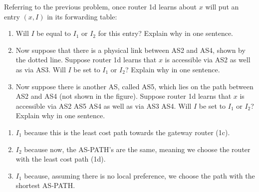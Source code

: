 \documentclass{report}
\begin{document}
\newpage
\begin{problem}
Referring to the previous problem, once router 1d learns about $x$ will put an entry $(x, I)$ in its forwarding table:
\begin{enumerate}
\item Will $I$ be equal to $I_1$ or $I_2$ for this entry? Explain why in one sentence.
\item Now suppose that there is a physical link between AS2 and AS4, shown by the dotted line.
Suppose router 1d learns that $x$ is accessible via AS2 as well as via AS3.
Will $I$ be set to $I_1$ or $I_2$? Explain why in one sentence.
\item Now suppose there is another AS, called AS5, which lies on the path between AS2 and AS4 (not shown in the figure).
Suppose router 1d learns that $x$ is accessible via AS2 AS5 AS4 as well as via AS3 AS4.
Will $I$ be set to $I_1$ or $I_2$? Explain why in one sentence.
\end{enumerate}


\begin{answer}{45em}
    \begin{enumerate}
        \item $I_1$ because this is the least cost path towards the gateway router (1c).
        \item $I_2$ because now, the AS-PATH's are the same, meaning we choose the router with the
            least cost path (1d).
        \item $I_1$ because, assuming there is no local preference, we choose the path with the
            shortest AS-PATH.
    \end{enumerate}
\end{answer}

\end{problem}
\end{document}
